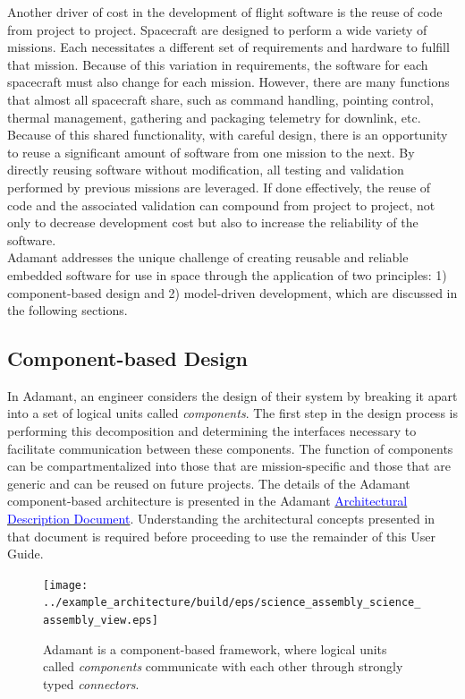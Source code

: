 Another driver of cost in the development of flight software is the reuse of code from project to project. Spacecraft are designed to perform a wide variety of missions. Each necessitates a different set of requirements and hardware to fulfill that mission. Because of this variation in requirements, the software for each spacecraft must also change for each mission. However, there are many functions that almost all spacecraft share, such as command handling, pointing control, thermal management, gathering and packaging telemetry for downlink, etc. Because of this shared functionality, with careful design, there is an opportunity to reuse a significant amount of software from one mission to the next. By directly reusing software without modification, all testing and validation performed by previous missions are leveraged. If done effectively, the reuse of code and the associated validation can compound from project to project, not only to decrease development cost but also to increase the reliability of the software. \\

Adamant addresses the unique challenge of creating reusable and reliable embedded software for use in space through the application of two principles: 1) component-based design and 2) model-driven development, which are discussed in the following sections.

\subsection{Component-based Design}

In Adamant, an engineer considers the design of their system by breaking it apart into a set of logical units called \textit{components}. The first step in the design process is performing this decomposition and determining the interfaces necessary to facilitate communication between these components. The function of components can be compartmentalized into those that are mission-specific and those that are generic and can be reused on future projects. The details of the Adamant component-based architecture is presented in the Adamant \href{https://github.com/lasp/adamant/blob/main/doc/architecture_description_document/architecture_description_document.pdf}{\textcolor{blue}{Architectural Description Document}}. Understanding the architectural concepts presented in that document is required before proceeding to use the remainder of this User Guide.

\begin{figure}[H]
  \texttt{[image: ../example\_architecture/build/eps/science\_assembly\_science\_assembly\_view.eps]}
  \caption{Adamant is a component-based framework, where logical units called \textit{components} communicate with each other through strongly typed \textit{connectors}.}
\end{figure}

